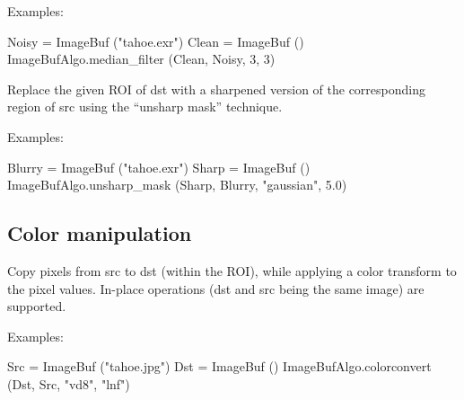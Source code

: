 \smallskip
\noindent Examples:
\begin{code}
    Noisy = ImageBuf ("tahoe.exr")
    Clean = ImageBuf ()
    ImageBufAlgo.median_filter (Clean, Noisy, 3, 3)
\end{code}
\apiend


 

Replace the given ROI of {\cf dst} with a sharpened version of the
corresponding region of {\cf src} using the ``unsharp mask'' technique.

\smallskip
\noindent Examples:
\begin{code}
    Blurry = ImageBuf ("tahoe.exr")
    Sharp = ImageBuf ()
    ImageBufAlgo.unsharp_mask (Sharp, Blurry, "gaussian", 5.0)
\end{code}
\apiend



\subsection{Color manipulation}
\label{sec:iba:py:color}

 
Copy pixels from {\cf src} to {\cf dst} (within the ROI), while
applying a color transform to the pixel values.
In-place operations ({\cf dst} and {\cf src} being the same image)
are supported.

\smallskip
\noindent Examples:
\begin{code}
    Src = ImageBuf ("tahoe.jpg")
    Dst = ImageBuf ()
    ImageBufAlgo.colorconvert (Dst, Src, "vd8", "lnf")
\end{code}
\apiend


